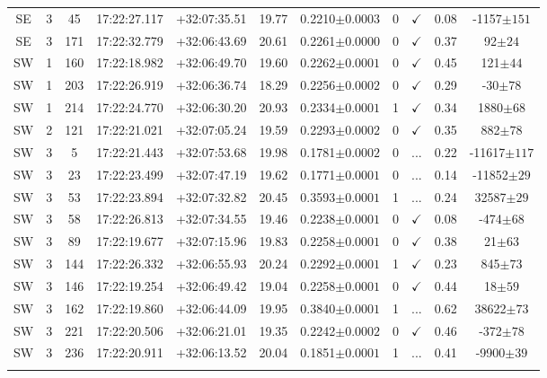 \begin{landscape}
\begin{longtable}{ccccccccccc}
	SE & 3 & 45 & 17:22:27.117 & +32:07:35.51 & 19.77 & 0.2210$\pm{0.0003}$ & 0 & $\checkmark$ & 0.08 & -1157$\pm{151}$ \\
	SE & 3 & 171 & 17:22:32.779 & +32:06:43.69 & 20.61 & 0.2261$\pm{0.0000}$ & 0 & $\checkmark$ & 0.37 & 92$\pm{24}$ \\
	SW & 1 & 160 & 17:22:18.982 & +32:06:49.70 & 19.60 & 0.2262$\pm{0.0001}$ & 0 & $\checkmark$ & 0.45 & 121$\pm{44}$ \\
	SW & 1 & 203 & 17:22:26.919 & +32:06:36.74 & 18.29 & 0.2256$\pm{0.0002}$ & 0 & $\checkmark$ & 0.29 & -30$\pm{78}$ \\
	SW & 1 & 214 & 17:22:24.770 & +32:06:30.20 & 20.93 & 0.2334$\pm{0.0001}$ & 1 & $\checkmark$ & 0.34 & 1880$\pm{68}$ \\
	SW & 2 & 121 & 17:22:21.021 & +32:07:05.24 & 19.59 & 0.2293$\pm{0.0002}$ & 0 & $\checkmark$ & 0.35 & 882$\pm{78}$ \\
	SW & 3 & 5 & 17:22:21.443 & +32:07:53.68 & 19.98 & 0.1781$\pm{0.0002}$ & 0 & ... & 0.22 & -11617$\pm{117}$ \\
	SW & 3 & 23 & 17:22:23.499 & +32:07:47.19 & 19.62 & 0.1771$\pm{0.0001}$ & 0 & ... & 0.14 & -11852$\pm{29}$ \\
	SW & 3 & 53 & 17:22:23.894 & +32:07:32.82 & 20.45 & 0.3593$\pm{0.0001}$ & 1 & ... & 0.24 & 32587$\pm{29}$ \\
	SW & 3 & 58 & 17:22:26.813 & +32:07:34.55 & 19.46 & 0.2238$\pm{0.0001}$ & 0 & $\checkmark$ & 0.08 & -474$\pm{68}$ \\
	SW & 3 & 89 & 17:22:19.677 & +32:07:15.96 & 19.83 & 0.2258$\pm{0.0001}$ & 0 & $\checkmark$ & 0.38 & 21$\pm{63}$ \\
	SW & 3 & 144 & 17:22:26.332 & +32:06:55.93 & 20.24 & 0.2292$\pm{0.0001}$ & 1 & $\checkmark$ & 0.23 & 845$\pm{73}$ \\
	SW & 3 & 146 & 17:22:19.254 & +32:06:49.42 & 19.04 & 0.2258$\pm{0.0001}$ & 0 & $\checkmark$ & 0.44 & 18$\pm{59}$ \\
	SW & 3 & 162 & 17:22:19.860 & +32:06:44.09 & 19.95 & 0.3840$\pm{0.0001}$ & 1 & ... & 0.62 & 38622$\pm{73}$ \\
	SW & 3 & 221 & 17:22:20.506 & +32:06:21.01 & 19.35 & 0.2242$\pm{0.0002}$ & 0 & $\checkmark$ & 0.46 & -372$\pm{78}$ \\
	SW & 3 & 236 & 17:22:20.911 & +32:06:13.52 & 20.04 & 0.1851$\pm{0.0001}$ & 1 & ... & 0.41 & -9900$\pm{39}$ \\
	\hline
	\label{2tbl:VCSJ172227.2+320757.2}
	\end{longtable}
\end{landscape}


